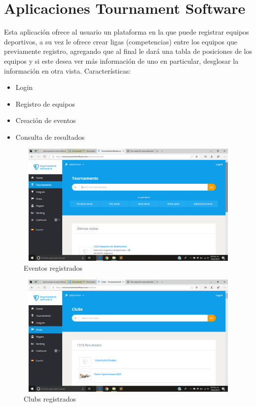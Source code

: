 \section{Aplicaciones Tournament Software}
\noindent Esta aplicación ofrece al usuario un plataforma en la que puede registrar equipos deportivos, a su vez le ofrece crear ligas (competencias) entre los equipos que previamente registro, agregando que al final le dará una tabla de posiciones de los equipos y si este desea ver más información de uno en particular, desglosar la información en otra vista. \cite{ts}
Características: 
\begin{itemize}
	\item Login
	\item Registro de equipos
	\item Creación de eventos
	\item Consulta de resultados
\end{itemize}
\pagebreak
\begin{figure}[h]
	\centering
	\includegraphics[width=12cm, height=6cm]{Imagenes/Aplicaciones/ToS1.png}
	\caption{Eventos registrados}
\end{figure}
\begin{figure}[h]
	\centering
	\includegraphics[width=12cm, height=6cm]{Imagenes/Aplicaciones/ToS2.png}
	\caption{Clubs registrados}
\end{figure}
